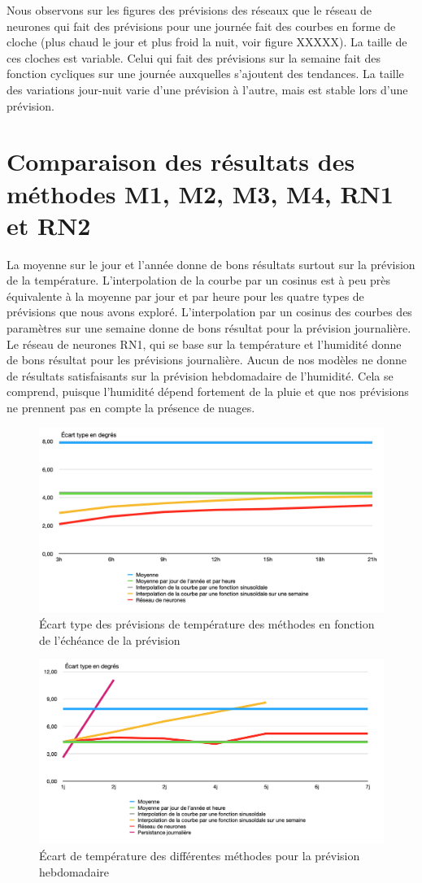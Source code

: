 \documentclass[11pt,a4paper]{article}
\begin{document}
Nous observons sur les figures des prévisions des réseaux que le réseau de neurones qui fait des prévisions pour une journée fait des courbes en forme de cloche (plus chaud le jour et plus froid la nuit, voir figure XXXXX). La taille de ces cloches est variable.
Celui qui fait des prévisions sur la semaine fait des fonction cycliques sur une journée auxquelles s'ajoutent des tendances. La taille des variations jour-nuit varie d'une prévision à l'autre, mais est stable lors d'une prévision.


\section{Comparaison des résultats des méthodes M1, M2, M3, M4, RN1 et RN2 }
La moyenne sur le jour et l'année donne de bons résultats surtout sur la prévision de la température. 
L'interpolation de la courbe par un cosinus est à peu près équivalente à la moyenne par jour et par heure pour les quatre types de prévisions que nous avons exploré.
L'interpolation par un cosinus des courbes des paramètres sur une semaine donne de bons résultat pour la prévision journalière.
Le réseau de neurones RN1, qui se base sur la température et l'humidité donne de bons résultat pour les prévisions journalière.
Aucun de nos modèles ne donne de résultats satisfaisants sur la prévision hebdomadaire de l'humidité. Cela se comprend, puisque l'humidité dépend fortement de la pluie et que nos prévisions ne prennent pas en compte la présence de nuages.

\begin{figure} [!h]
\centering
\includegraphics[width=0.7 \textwidth]{./imagesTIPE/ecartjT.png}\quad
\caption{\label{fig:cosDS} Écart type des prévisions de température des méthodes en fonction de l'échéance de la prévision}
\end{figure}

\begin{figure} [!h]
\centering
\includegraphics[width=0.7 \textwidth]{./imagesTIPE/ecartsT.png}\quad
\caption{\label{fig:cosDS} Écart de température des différentes méthodes pour la prévision hebdomadaire}
\end{figure}
\end{document}
